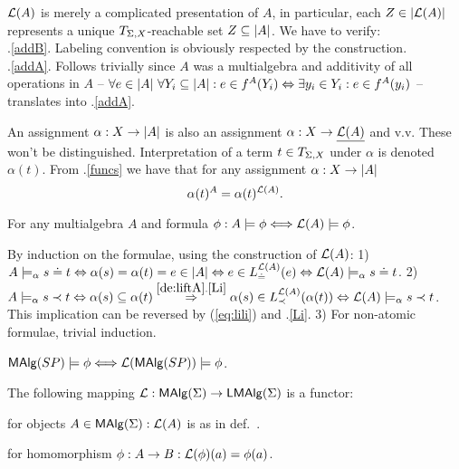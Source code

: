 \documentclass[12pt]{article}
\begin{document}
\begin{Proof}
${\cal L}(A)$ is merely a complicated presentation of $A$, in particular, each
$Z\in|{\cal L}(A)|$ represents a unique $T_{\Sigma,X}$-reachable set
$Z\subseteq|A|$. We have to verify:\\[.5ex]
%
.\ref{addB}. Labeling convention is obviously respected by the construction.
\\[.5ex]
.\ref{addA}. Follows trivially since $A$ was a multialgebra and
additivity of all operations in $A$ -- $\forall e\in|A|\ \forall Y_i\subseteq|A|:
e\in f^A(Y_i)\Leftrightarrow \exists y_i\in Y_i:e\in
f^A(y_i)$ -- translates into .\ref{addA}.
\end{Proof}
An assignment $\alpha:X\rightarrow |A|$ is also an assignment
$\alpha:X\rightarrow \underline {{\cal L}(A)}$ and v.v. These won't be distinguished.  
Interpretation of a term $t\in T_{\Sigma,X}$ under $\alpha$ is denoted
$\alpha(t)$. From .\ref{funcs} we have that for
any assignment $\alpha:X\rightarrow|A|$
\begin{equation}
{\alpha(t)^A}= \alpha(t)^{{\cal L}(A)}. \label{eq:lili}
\end{equation}
\begin{Claim}\label{pr:liftA}
For any multialgebra $A$ and formula $\phi: A\models\phi\Longleftrightarrow {\cal L}(A)\models\phi$.
\end{Claim}
\begin{Proof}
By induction on the formulae, using the construction of ${\cal L}(A)$: 1) $A\models_\alpha s\mathrel{\dot{=} } t \Leftrightarrow
\alpha(s)=\alpha(t)=e\in|A|\Leftrightarrow e\in L_{\mathrel{\dot{=} }}^{{\cal L}(A)}(e)\Leftrightarrow {\cal L}(A)\models_\alpha
s\mathrel{\dot{=} } t$. 
%
2) $A\models_\alpha s\incl t \iff \alpha(s)\subseteq
\alpha(t) \by{\refb{de:liftA}.\ref{Li}}{\impl} \alpha(s)\in
\Li^{\lift A}(\alpha(t)) \iff \lift
A\models_\alpha s\incl t$. This implication can be reversed by 
(\ref{eq:lili}) and .\ref{Li}.
%
3) For non-atomic formulae, trivial induction.
\end{Proof}

\begin{Corollary}\label{Liff}
${\sf MAlg}(SP) \models \phi \Longleftrightarrow {\cal L}({\sf MAlg}(SP))\models \phi$.
\end{Corollary}

\begin{Claim}
The following mapping ${\cal L}:{\sf MAlg}(\Sigma)\rightarrow{\sf LMAlg}(\Sigma)$ is a functor: 
\begin{enum}
\item for objects $A\in{\sf MAlg}(\Sigma): {\cal L}(A)$ is as in def.~.
\item for homomorphism $\phi:A\rightarrow B : {\cal L}(\phi)(a) = \phi(a)$.
\end{enum}
\end{Claim}
\end{document}
